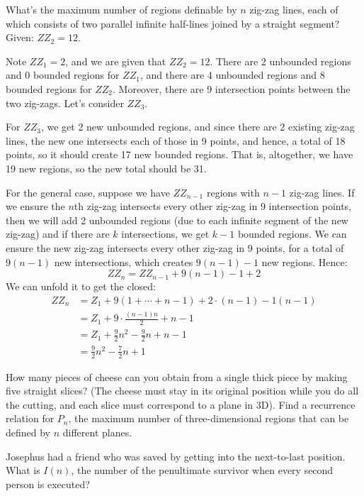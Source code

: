 \documentclass[12pt]{article}
\newenvironment{ex}[2][Exercise]{\begin{trivlist}
		\item[\hskip \labelsep {\bfseries #1}\hskip \labelsep {\bfseries #2.}]}{\end{trivlist}}
\newenvironment{sol}[1][Solution]{\begin{trivlist}
		\item[\hskip \labelsep {\bfseries #1:}]}{\end{trivlist}}
\begin{document}
\begin{ex}{13}
	What's the maximum number of regions definable by $n$ zig-zag lines,
	each of which consists of two parallel infinite half-lines joined by
	a straight segment? Given: $ZZ_2=12$.
\end{ex}

\begin{sol}
	Note $ZZ_1=2$, and we are given that $ZZ_2=12$. There are 2 unbounded regions
	and 0 bounded regions for $ZZ_1$, and there are 4 unbounded regions and 8
	bounded regions for $ZZ_2$. Moreover, there are 9 intersection points between
	the two zig-zags. Let's consider $ZZ_3$.
	\
	
	For $ZZ_3$, we get 2 new unbounded regions, and since there are 2 existing
	zig-zag lines, the new one intersects each of those in 9 points, and hence,
	a total of 18 points, so it should create 17 new bounded regions.
	That is, altogether, we have 19 new regions, so the new total should be 31.
	
	For the general case, suppose we have $ZZ_{n-1}$ regions with $n-1$ zig-zag lines. If we ensure the $n$th zig-zag intersects every other zig-zag in 9
	intersection points, then we will add 2 unbounded regions (due to each infinite
	segment of the new zig-zag) and if there are $k$ intersections, we get $k-1$
	bounded regions. We can ensure the new zig-zag intersects every other
	zig-zag in 9 points, for a total of $9(n-1)$ new intersections, which
	creates $9(n-1)-1$ new regions. Hence:
	\[
	ZZ_n=ZZ_{n-1}+9(n-1)-1+2
	\]
	We can unfold it to get the closed:
	\begin{align*}
		ZZ_n&=Z_1+9(1+\cdots+n-1)+2\cdot (n-1)-1(n-1)\\
		&=Z_1+9\cdot \frac{(n-1)n}{2}+n-1\\
		&=Z_1+\frac{9}{2}n^2-\frac{9}{2}n+n-1\\
		&=\frac{9}{2}n^2-\frac{7}{2}n+1
	\end{align*}
\end{sol}

\begin{ex}{14}
	How many pieces of cheese can you obtain from a single thick piece
	by making five straight slices? (The cheese must stay in its original
	position while you do all the cutting, and each slice must correspond
	to a plane in 3D). Find a recurrence relation for $P_n$, the maximum
	number of three-dimensional regions that can be defined by $n$
	different planes.
\end{ex}

\begin{ex}{15}
	Josephus had a friend who was saved by getting into the next-to-last
	position. What is $I(n)$, the number of the penultimate survivor when
	every second person is executed?
\end{ex}
\end{document}
